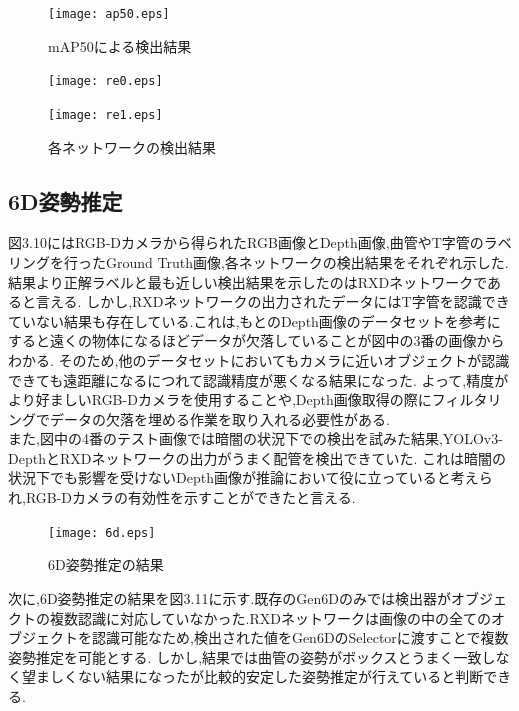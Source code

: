 \begin{figure}[htbt]
	\centering
	
	 \texttt{[image: ap50.eps]}
	 \caption{mAP50による検出結果}
	 \label{fig:f2}
\end{figure}

\newpage

\begin{figure}[htbt]
	\centering
	 \texttt{[image: re0.eps]}
	 \label{fig:f2}
\end{figure}

\begin{figure}[htbt]
	\centering
	 \texttt{[image: re1.eps]}
	 \caption{各ネットワークの検出結果}
	 \label{fig:f2}
\end{figure}

\newpage

\clearpage
\subsection{6D姿勢推定}
図3.10にはRGB-Dカメラから得られたRGB画像とDepth画像,曲管やT字管のラベリングを行ったGround Truth画像,各ネットワークの検出結果をそれぞれ示した.結果より正解ラベルと最も近しい検出結果を示したのはRXDネットワークであると言える.
しかし,RXDネットワークの出力されたデータにはT字管を認識できていない結果も存在している.これは,もとのDepth画像のデータセットを参考にすると遠くの物体になるほどデータが欠落していることが図中の3番の画像からわかる.
そのため,他のデータセットにおいてもカメラに近いオブジェクトが認識できても遠距離になるにつれて認識精度が悪くなる結果になった.
よって,精度がより好ましいRGB-Dカメラを使用することや,Depth画像取得の際にフィルタリングでデータの欠落を埋める作業を取り入れる必要性がある.\\
 また,図中の4番のテスト画像では暗闇の状況下での検出を試みた結果,YOLOv3-DepthとRXDネットワークの出力がうまく配管を検出できていた.
これは暗闇の状況下でも影響を受けないDepth画像が推論において役に立っていると考えられ,RGB-Dカメラの有効性を示すことができたと言える.

\begin{figure}[htbt]
	\centering
	 \texttt{[image: 6d.eps]}
	 \caption{6D姿勢推定の結果}
	 \label{fig:f2}
\end{figure}

次に,6D姿勢推定の結果を図3.11に示す.既存のGen6Dのみでは検出器がオブジェクトの複数認識に対応していなかった.RXDネットワークは画像の中の全てのオブジェクトを認識可能なため,検出された値をGen6DのSelectorに渡すことで複数姿勢推定を可能とする.
しかし,結果では曲管の姿勢がボックスとうまく一致しなく望ましくない結果になったが比較的安定した姿勢推定が行えていると判断できる.

